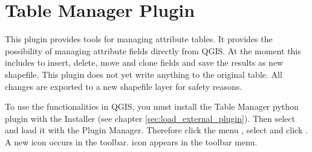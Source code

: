 
\section{Table Manager Plugin}
\label{sec:table_manager}


This plugin provides tools for managing attribute tables. It provides the 
possibility of managing attribute fields directly from QGIS. At the moment 
this includes to insert, delete, move and clone fields and save the results 
as new shapefile. This plugin does not yet write anything to the original 
table. All changes are exported to a new shapefile layer for safety reasons.


To use the functionalities in QGIS, you must install the Table Manager python 
plugin with the  Installer (see chapter 
\ref{sec:load_external_plugin}). Then select and load it with the Plugin Manager. 
Therefore click the menu  \arrow 
{}, select  and click 
. A new  icon occurs 
in the toolbar. icon appears in the toolbar menu.





